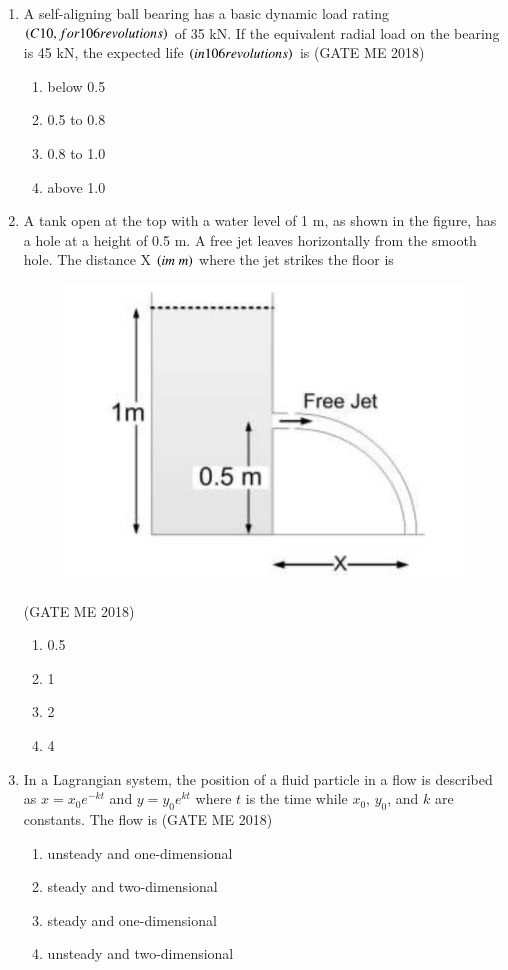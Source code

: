\documentclass[journal]{IEEEtran}
\numberwithin{equation}{enumi}
\numberwithin{figure}{enumi}
\begin{document}
\begin{enumerate}
 \item A self-aligning ball bearing has a basic dynamic load rating $\left(C10, for 106 revolutions\right)$ of
35 kN. If the equivalent radial load on the bearing is 45 kN, the expected life $\left(in 106
revolutions\right)$ is
\hfill{(GATE ME 2018)}
\begin{enumerate}
    \item below 0.5
\item  0.5 to 0.8
\item  0.8 to 1.0
\item  above 1.0
\end{enumerate}
 \item A tank open at the top with a water level of 1 m, as shown in the figure, has a hole at a height
of 0.5 m. A free jet leaves horizontally from the smooth hole. The distance X $\left(im\;m\right)$ where
the jet strikes the floor is
\begin{figure}[H]
    \centering
    \includegraphics[width = 0.6\columnwidth]{figs/fig3.8.png}
    \caption*{}
    \label{fig:Q33}
    \end{figure}
    \hfill{(GATE ME 2018)}
    \begin{enumerate}
        \item 0.5
        \item 1
        \item 2
        \item 4
    \end{enumerate}
    \item In a Lagrangian system, the position of a fluid particle in a flow is described as 
$x = x_0 e^{-kt}$ and $y = y_0 e^{kt}$ where $t$ is the time while $x_0$, $y_0$, and $k$ are constants. 
The flow is
\hfill{(GATE ME 2018)}
\begin{multicols}{2}
\begin{enumerate}
 \item unsteady and one-dimensional
  \item steady and two-dimensional
  \item steady and one-dimensional
  \item unsteady and two-dimensional
\end{enumerate}
\end{multicols}


\end{enumerate}
\end{document}
